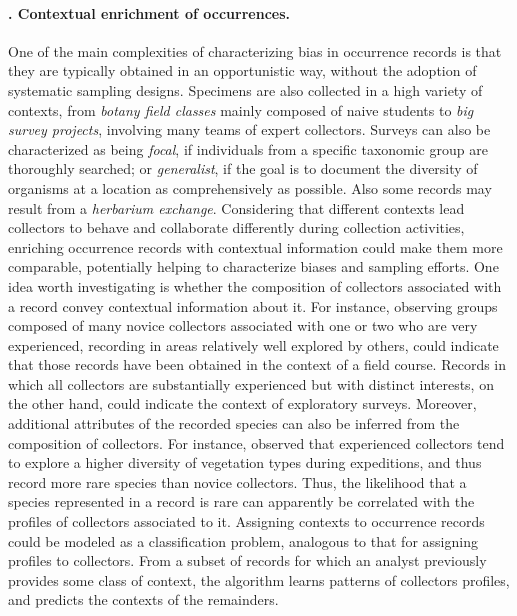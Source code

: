 \paragraph*{\theApplicationCase. Contextual enrichment of occurrences.}
One of the main complexities of characterizing bias in occurrence records is that they are typically obtained in an opportunistic way, without the adoption of systematic sampling designs.
Specimens are also collected in a high variety of contexts, from \textit{botany field classes} mainly composed of naive students to \textit{big survey projects}, involving many teams of expert collectors.
Surveys can also be characterized as being \textit{focal}, if individuals from a specific taxonomic group are thoroughly searched; or \textit{generalist}, if the goal is to document the diversity of organisms at a location as comprehensively as possible.
Also some records may result from a \textit{herbarium exchange}.
Considering that different contexts lead collectors to behave and collaborate differently during collection activities, enriching occurrence records with contextual information could make them more comparable, potentially helping to characterize biases and sampling efforts. 
%
One idea worth investigating is whether the composition of collectors associated with a record convey contextual information about it.
For instance, observing groups composed of many novice collectors associated with one or two who are very experienced, recording in areas relatively well explored by others, could indicate that those records have been obtained in the context of a field course.
Records in which all collectors are substantially experienced but with distinct interests, on the other hand, could indicate the context of exploratory surveys.
%
Moreover, additional attributes of the recorded species can also be inferred from the composition of collectors.
For instance,  observed that experienced collectors tend to explore a higher diversity of vegetation types during expeditions, and thus record more rare species than novice collectors.
Thus, the likelihood that a species represented in a record is rare can apparently be correlated with the profiles of collectors associated to it.
%
Assigning contexts to occurrence records could be modeled as a classification problem, analogous to that for assigning profiles to collectors.
From a subset of records for which an analyst previously provides some class of context, the algorithm learns patterns of collectors profiles, and predicts the contexts of the remainders.


